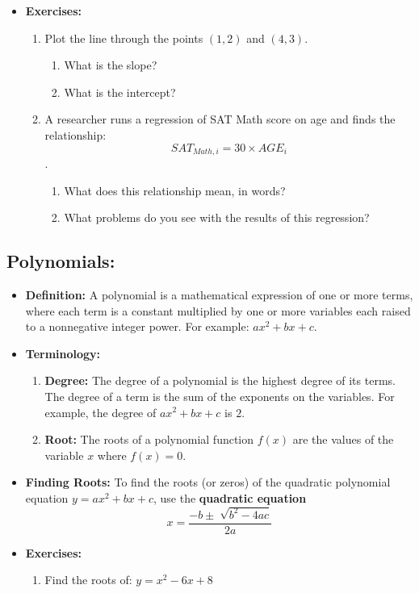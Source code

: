 \documentclass[11pt]{article}
\theoremstyle{definition}
\theoremstyle{remark}
\begin{document}
\begin{itemize}
\item \textbf{Exercises:}
\begin{enumerate}
\item Plot the line through the points $(1,2)$ and $(4,3)$. 
\begin{enumerate}
\item What is the slope? 
\item What is the intercept?
\end{enumerate}
\item A researcher runs a regression of SAT Math score on age and finds the relationship: $$SAT_{Math,i} = 30 \times AGE_i$$.
\begin{enumerate}
\item What does this relationship mean, in words?
\item What problems do you see with the results of this regression?
\end{enumerate}
\end{enumerate}

\end{itemize}

\subsection{Polynomials:} 
\begin{itemize}


\item\textbf{Definition:} A polynomial is a mathematical expression of one or more terms, where each term is a constant multiplied by one or more variables each raised to a nonnegative integer power. For example: $ax^2 + bx + c$.
\item\textbf{Terminology:}
\begin{enumerate}
\item \textbf{Degree:} The degree of a polynomial is the highest degree of its terms. The degree of a term is the sum of the exponents on the variables. For example, the degree of $ax^2 + bx + c$ is $2$.
\item \textbf{Root:} The roots of a polynomial function $f(x)$ are the values of the variable $x$ where $f(x)=0$.  
\end{enumerate}
\item\textbf{Finding Roots:} To find the roots (or zeros) of the quadratic polynomial equation $y=ax^2 + bx + c$, use the \textbf{quadratic equation} \\
\begin{equation*}
x = \frac{-b \pm \sqrt[]{b^2-4ac}}{2a}
\end{equation*}

\item \textbf{Exercises:}
\begin{enumerate}
\item Find the roots of: $y=x^2 - 6x + 8$
\end{enumerate}
\end{itemize}
\end{document}
